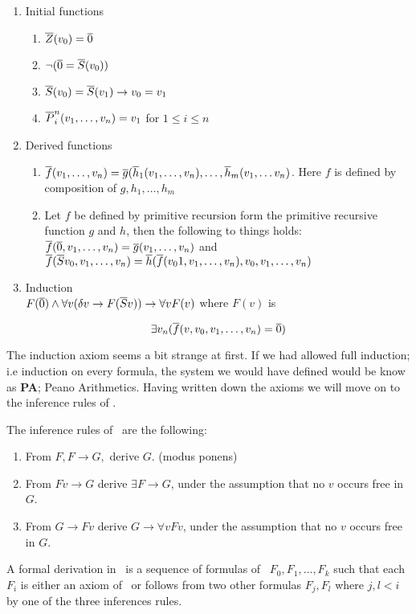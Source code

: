 \documentclass[../main.tex]{subfiles}
\begin{document}
\begin{defi}
\begin{enumerate}
\begin{enumerate}
				\item Initial functions
					\begin{enumerate}
						\item $\overline{Z}(v_0)=\overline{0}$
						\item $\neg(\overline{0} =\overline S(v_0))$
						\item $\overline S(v_0)=\overline
							S(v_1)\rightarrow
							v_0=v_1$
						\item $\overline
							P^n_i(v_1,\ldots,v_n)=v_1$
							for $1\leq i\leq n$
					\end{enumerate}
				\item Derived functions
					\begin{enumerate}
						\item $\overline
							f(v_1,\ldots,v_n)=\overline
							g(\overline
							h_1(v_1,\ldots,v_n),\ldots,\overline
							h_m(v_1,\ldots v_n)$.
							Here $f$ is defined by
							composition of
							$g,h_1,\ldots, h_m$
						\item Let $f$ be defined by
							primitive recursion
							form the primitive
							recursive function $g$
							and $h$, then the
							following to things
							holds:\\
							$\overline
							f(\overline{0},v_1,\ldots,v_n)=\overline
							g(v_1,\ldots, v_n)$
							and\\
							$\overline f(\overline
							Sv_0,v_1,\ldots,v_n)=\overline
							h(\overline
							f(v_01,v_1,\ldots,v_n),v_0,v_1,\ldots,v_n)$
					\end{enumerate}
				\item Induction\\
					$F(\overline{0})\wedge\forall v(\delta
					v\rightarrow F (\overline Sv))\rightarrow
					\forall vF( v)$ where $F( v)$ is

					\[\exists v_n(\overline
					f(v,v_0,v_1,\ldots,v_n)=\overline 0)\]
			\end{enumerate}
	\end{enumerate}
\end{defi}
The induction axiom seems a bit strange at first. If we had allowed full
induction; i.e induction on every formula, the system we would have defined
would be know as \textbf{PA}; Peano Arithmetics.  Having written down the axioms we will move on to the
inference rules of \PRA.
\begin{defi}
	The inference rules of \PRA\ are the following:
	\begin{enumerate}
		\item From $F,F\rightarrow G,$ derive $G$.
			(modus ponens)
		\item From $F v\rightarrow G$ derive $\exists
			F\rightarrow G$, under the assumption that no
			$v$ occurs free in $G$.
		\item From $G\rightarrow F v$ derive $G\rightarrow
			\forall v F v$, under the assumption that no
			$v$ occurs free in $G$.
	\end{enumerate}
	A formal derivation in \PRA\ is a sequence of formulas of \PRA\
	$F_0,F_1,\ldots,F_k$ such that each $F_i$ is either
	an axiom of \PRA\ or follows from two other formulas $F_j,F_l$
	where $j,l<i$ by one of the three inferences rules.
\end{defi}
\end{document}
